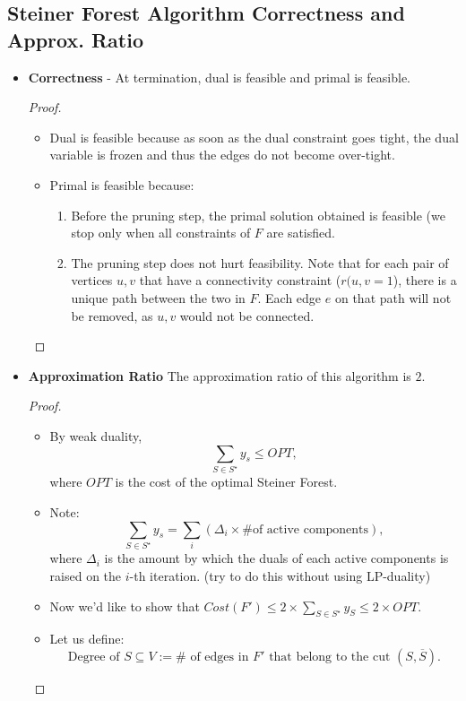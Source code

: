 \documentclass[../main/main.tex]{subfiles}
\begin{document}
\subsection{Steiner Forest Algorithm Correctness and Approx. Ratio}
\begin{itemize}
	\item\textbf{Correctness} - At termination, dual is feasible and primal is feasible. 
	\begin{proof}
		\begin{itemize}
			\item Dual is feasible because as soon as the dual constraint goes tight, the dual variable is frozen and thus the edges do not become over-tight.
			\item Primal is feasible because:
				\begin{enumerate}
					\item Before the pruning step, the primal solution obtained is feasible (we stop only when all constraints of $F$ are satisfied.
					\item The pruning step does not hurt feasibility. Note that for each pair of vertices $u,v$ that have a connectivity constraint ($r(u,v=1$), there is a unique path between the two in $F$. Each edge $e$ on that path will not be removed, as $u,v$ would not be connected. 
				\end{enumerate}
		\end{itemize}
	\end{proof}
\item\textbf{Approximation Ratio} The approximation ratio of this algorithm is $2$.
	\begin{proof}
		\begin{itemize}
			\item By weak duality, \[
			\sum\limits_{S\in S^{\star}} y_s \le OPT
			,\] where $OPT$ is the cost of the optimal Steiner Forest.
		\item Note: \[
				\sum_{S\in S^{\star}}y_s=\sum_i \left(\Delta_i\times \text{\# of active components}\right)
			,\] where $\Delta_i$ is the amount by which the duals of each active components is raised on the $i$-th iteration. (try to do this without using LP-duality)
		\item Now we'd like to show that $Cost(F')\le 2\times \sum\limits_{S\in S^{\star}}y_S\le 2\times OPT$.
		\item Let us define: \[
				\text{Degree of $S\subseteq V$}:= \# \text{ of edges in $F'$ that belong to the cut $(S,\overline{S})$}
			.\]
			\begin{figure}[h!]

\end{figure}
\end{itemize}
\end{proof}
\end{itemize}
\end{document}
